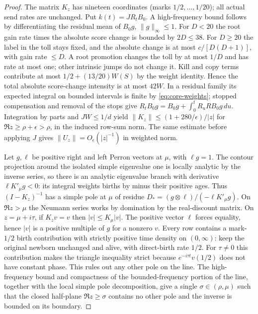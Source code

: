 \documentclass[11pt]{article}
\theoremstyle{remark}
\numberwithin{equation}{section}
\begin{document}
\begin{proof}
The matrix $K_z$ has nineteen coordinates (marks $1/2,\ldots,1/20$); all actual send rates are unchanged. Put $k(t)=JR_tB_0$. A high-frequency bound follows by differentiating the residual mean of $B_0g$, $\|g\|_\infty\le1$. For $D<20$ the root gain rate times the absolute score change is bounded by $2D\le38$. For $D\ge20$ the label in the toll stays fixed, and the absolute change is at most $c/[D(D+1)]$, with gain rate $\le D$. A root promotion changes the toll by at most $1/D$ and has rate at most one; other intrinsic jumps do not change it. Kill and copy terms contribute at most $1/2+(13/20)W(S)$ by the weight identity. Hence the total absolute score-change intensity is at most $42W$. In a residual family its expected integral on bounded intervals is finite by \eqref{eq:core-weights}; stopped compensation and removal of the stops give $R_t B_0g=B_0g+\int_0^t R_uRB_0g\,du$. Integration by parts and $JW\le 1/d$ yield $\|K_z\|\le (1+280/\epsilon)/|z|$ for $\Re z\ge\rho+\epsilon>\rho$, in the induced row-sum norm. The same estimate before applying $J$ gives $\|U_z\|=O_\epsilon(|z|^{-1})$ in weighted norm.

Let $g,\ell$ be positive right and left Perron vectors at $\mu$, with $\ell g=1$. The contour projection around the isolated simple eigenvalue one is locally analytic by the inverse series, so there is an analytic eigenvalue branch with derivative $\ell K'_\mu g<0$: its integral weights births by minus their positive ages. Thus $(I-K_z)^{-1}$ has a simple pole at $\mu$ of residue $D_*=(g\otimes\ell)/(-\ell K'_\mu g)$. On $\Re z>\mu$ the Neumann series works by domination by the real-discount matrix. On $z=\mu+i\tau$, if $K_zv=v$ then $|v|\le K_\mu|v|$. The positive vector $\ell$ forces equality, hence $|v|$ is a positive multiple of $g$ for a nonzero $v$. Every row contains a mark-$1/2$ birth contribution with strictly positive time density on $(0,\infty)$: keep the original newborn unchanged and alive, with direct-birth rate $1/2$. For $\tau\ne0$ this contribution makes the triangle inequality strict because $e^{-i\tau t}v(1/2)$ does not have constant phase. This rules out any other pole on the line. The high-frequency bound and compactness of the bounded-frequency portion of the line, together with the local simple pole decomposition, give a single $\sigma\in(\rho,\mu)$ such that the closed half-plane $\Re z\ge\sigma$ contains no other pole and the inverse is bounded on its boundary.


\end{proof}
\end{document}
